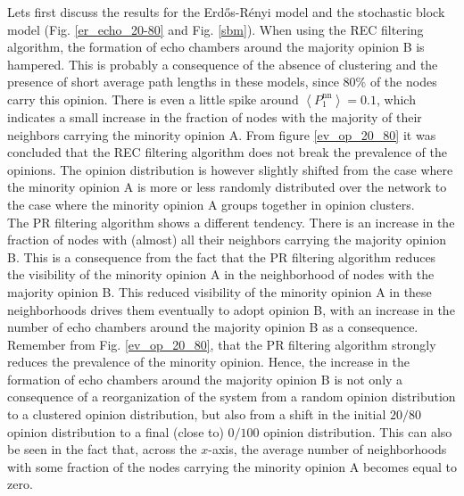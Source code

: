 \documentclass[11 pt , letterpaper , twoside , openright]{book}
\begin{document}
\noindent
Lets first discuss the results for the Erd\H{o}s-R\'{e}nyi model and the stochastic block model (Fig. \ref{er_echo_20-80} and Fig. \ref{sbm}). When using the REC filtering algorithm, the formation of echo chambers around the majority opinion B is hampered. This is probably a consequence of the absence of clustering and the presence of short average path lengths in these models, since $80\%$ of the nodes carry this opinion. There is even a little spike around $\left<P_1^{\text{nn}}\right> = 0.1$, which indicates a small increase in the fraction of nodes with the majority of their neighbors carrying the minority opinion A. From figure \ref{ev_op_20_80} it was concluded that the REC filtering algorithm does not break the prevalence of the opinions. The opinion distribution is however slightly shifted from the case where the minority opinion A is more or less randomly distributed over the network to the case where the minority opinion A groups together in opinion clusters. \\
\newline
The PR filtering algorithm shows a different tendency. There is an increase in the fraction of nodes with (almost) all their neighbors carrying the majority opinion B. This is a consequence from the fact that the PR filtering algorithm reduces the visibility of the minority opinion A in the neighborhood of nodes with the majority opinion B. This reduced visibility of the minority opinion A in these neighborhoods drives them eventually to adopt opinion B, with an increase in the number of echo chambers around the majority opinion B as a consequence. Remember from Fig. \ref{ev_op_20_80}, that the PR filtering algorithm strongly reduces the prevalence of the minority opinion. Hence, the increase in the formation of echo chambers around the majority opinion B is not only a consequence of a reorganization of the system from a random opinion distribution to a clustered opinion distribution, but also from a shift in the initial $20/80$ opinion distribution to a final (close to) $0/100$ opinion distribution. This can also be seen in the fact that, across the $x$-axis, the average number of neighborhoods with some fraction of the nodes carrying the minority opinion A becomes equal to zero. \\
\newline
\end{document}
